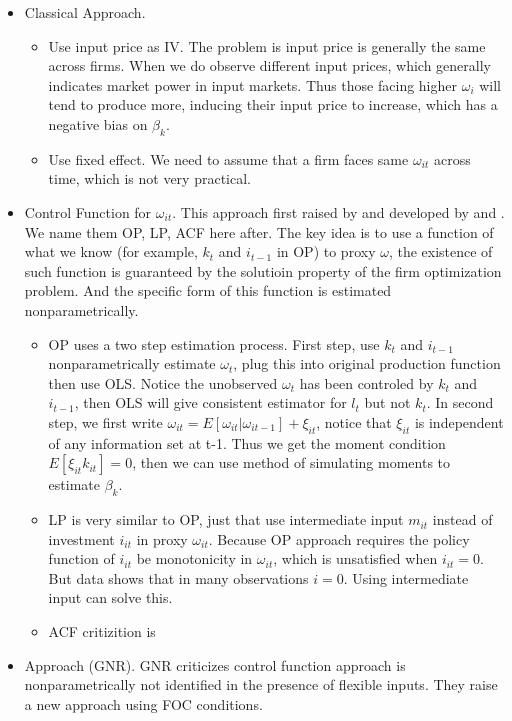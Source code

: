 \documentclass{book}
\theoremstyle{plain}
\theoremstyle{definition}
\begin{document}
\begin{itemize}
	\item Classical Approach.
	\begin{itemize}
		\item Use input price as IV. The problem is input price is generally the same across firms. When we do observe different input prices, which generally indicates market power in input markets. Thus those facing higher $\omega_i$ will tend to produce more, inducing their input price to increase, which has a negative bias on $\beta_k$.
		\item Use fixed effect. We need to assume that a firm faces same $\omega_{it}$ across time, which is not very practical.
	\end{itemize}
	\item Control Function for  $\omega_{it}$. This approach first raised by \cite{Olley:1996ef} and developed by \cite{Levinsohn:2003ej} and \cite{Ackerberg:2015ha}. We name them OP, LP, ACF here after. The key idea is to use a function of what we know (for example, $k_t$ and $i_{t-1}$ in OP) to proxy $\omega$, the existence of such function is guaranteed by the solutioin property of the firm optimization problem. And the specific form of this function is estimated nonparametrically.
	\begin{itemize}
		\item OP uses a two step estimation process. First step, use $k_t$ and $i_{t-1}$ nonparametrically estimate $\omega_t$, plug this into original production function then use OLS. Notice the unobserved $\omega_t$ has been controled by $k_t$ and $i_{t-1}$, then OLS will give consistent estimator for $l_t$ but not $k_t$. In second step, we first write $\omega_{it} = E[\omega_{it}|\omega_{it-1}]+\xi_{it}$, notice that $\xi_{it}$ is independent of any information set at t-1. Thus we get the moment condition $E[\xi_{it}k_{it}]=0$, then we can use method of simulating moments to estimate $\beta_k$.
		\item LP is very similar to OP, just that use intermediate input $m_{it}$ instead of investment $i_{it}$ in proxy $\omega_{it}$. Because OP approach requires the policy function of $i_{it}$ be monotonicity in $\omega_{it}$, which is unsatisfied when $i_{it}=0$. But data shows that in many observations $i=0$. Using intermediate input can solve this.
		\item ACF critizition is
	\end{itemize}
	\item \cite{Gandhi:2017un} Approach (GNR). GNR criticizes control function approach is nonparametrically not identified in the presence of flexible inputs. They raise a new approach using FOC conditions.
\end{itemize}
\end{document}

